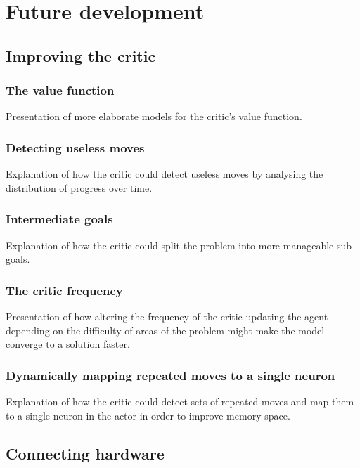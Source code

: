 \documentclass[10pt]{article}
\begin{document}
    \section{Future development}

    \subsection{Improving the critic}

    \subsubsection{The value function}

    Presentation of more elaborate models for the critic's value function.

    \subsubsection{Detecting useless moves}

    Explanation of how the critic could detect useless moves by analysing the distribution of progress over time.

    \subsubsection{Intermediate goals}

    Explanation of how the critic could split the problem into more manageable sub-goals.

    \subsubsection{The critic frequency}

    Presentation of how altering the frequency of the critic updating the agent depending on the difficulty of areas of the problem might make the model converge to a solution faster.

    \subsubsection{Dynamically mapping repeated moves to a single neuron}

    Explanation of how the critic could detect sets of repeated moves and map them to a single neuron in the actor in order to improve memory space.
    
    \subsection{Connecting hardware}
\end{document}
